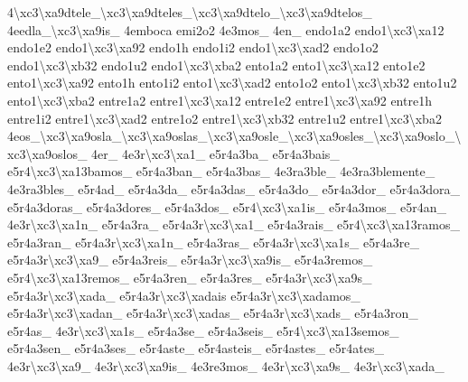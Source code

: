{4\textbackslash{}xc3\textbackslash{}xa9dtele\-\_\textbackslash{}xc3\textbackslash{}xa9dteles\-\_\textbackslash{}xc3\textbackslash{}xa9dtelo\-\_\textbackslash{}xc3\textbackslash{}xa9dtelos\-\_\- 4eedla\-\_\textbackslash{}xc3\textbackslash{}xa9is\-\_\- 4emboca emi2o2 4e3mos\-\_\- 4en\-\_\- endo1a2 endo1\textbackslash{}xc3\textbackslash{}xa12 endo1e2 endo1\textbackslash{}xc3\textbackslash{}xa92 endo1h endo1i2 endo1\textbackslash{}xc3\textbackslash{}xad2 endo1o2 endo1\textbackslash{}xc3\textbackslash{}xb32 endo1u2 endo1\textbackslash{}xc3\textbackslash{}xba2 ento1a2 ento1\textbackslash{}xc3\textbackslash{}xa12 ento1e2 ento1\textbackslash{}xc3\textbackslash{}xa92 ento1h ento1i2 ento1\textbackslash{}xc3\textbackslash{}xad2 ento1o2 ento1\textbackslash{}xc3\textbackslash{}xb32 ento1u2 ento1\textbackslash{}xc3\textbackslash{}xba2 entre1a2 entre1\textbackslash{}xc3\textbackslash{}xa12 entre1e2 entre1\textbackslash{}xc3\textbackslash{}xa92 entre1h entre1i2 entre1\textbackslash{}xc3\textbackslash{}xad2 entre1o2 entre1\textbackslash{}xc3\textbackslash{}xb32 entre1u2 entre1\textbackslash{}xc3\textbackslash{}xba2 4eos\-\_\textbackslash{}xc3\textbackslash{}xa9osla\-\_\textbackslash{}xc3\textbackslash{}xa9oslas\-\_\textbackslash{}xc3\textbackslash{}xa9osle\-\_\textbackslash{}xc3\textbackslash{}xa9osles\-\_\textbackslash{}xc3\textbackslash{}xa9oslo\-\_\textbackslash{}xc3\textbackslash{}xa9oslos\-\_\- 4er\-\_\- 4e3r\textbackslash{}xc3\textbackslash{}xa1\-\_\- e5r4a3ba\-\_\- e5r4a3bais\-\_\- e5r4\textbackslash{}xc3\textbackslash{}xa13bamos\-\_\- e5r4a3ban\-\_\- e5r4a3bas\-\_\- 4e3ra3ble\-\_\- 4e3ra3blemente\-\_\- 4e3ra3bles\-\_\- e5r4ad\-\_\- e5r4a3da\-\_\- e5r4a3das\-\_\- e5r4a3do\-\_\- e5r4a3dor\-\_\- e5r4a3dora\-\_\- e5r4a3doras\-\_\- e5r4a3dores\-\_\- e5r4a3dos\-\_\- e5r4\textbackslash{}xc3\textbackslash{}xa1is\-\_\- e5r4a3mos\-\_\- e5r4an\-\_\- 4e3r\textbackslash{}xc3\textbackslash{}xa1n\-\_\- e5r4a3ra\-\_\- e5r4a3r\textbackslash{}xc3\textbackslash{}xa1\-\_\- e5r4a3rais\-\_\- e5r4\textbackslash{}xc3\textbackslash{}xa13ramos\-\_\- e5r4a3ran\-\_\- e5r4a3r\textbackslash{}xc3\textbackslash{}xa1n\-\_\- e5r4a3ras\-\_\- e5r4a3r\textbackslash{}xc3\textbackslash{}xa1s\-\_\- e5r4a3re\-\_\- e5r4a3r\textbackslash{}xc3\textbackslash{}xa9\-\_\- e5r4a3reis\-\_\- e5r4a3r\textbackslash{}xc3\textbackslash{}xa9is\-\_\- e5r4a3remos\-\_\- e5r4\textbackslash{}xc3\textbackslash{}xa13remos\-\_\- e5r4a3ren\-\_\- e5r4a3res\-\_\- e5r4a3r\textbackslash{}xc3\textbackslash{}xa9s\-\_\- e5r4a3r\textbackslash{}xc3\textbackslash{}xada\-\_\- e5r4a3r\textbackslash{}xc3\textbackslash{}xadais e5r4a3r\textbackslash{}xc3\textbackslash{}xadamos\-\_\- e5r4a3r\textbackslash{}xc3\textbackslash{}xadan\-\_\- e5r4a3r\textbackslash{}xc3\textbackslash{}xadas\-\_\- e5r4a3r\textbackslash{}xc3\textbackslash{}xads\-\_\- e5r4a3ron\-\_\- e5r4as\-\_\- 4e3r\textbackslash{}xc3\textbackslash{}xa1s\-\_\- e5r4a3se\-\_\- e5r4a3seis\-\_\- e5r4\textbackslash{}xc3\textbackslash{}xa13semos\-\_\- e5r4a3sen\-\_\- e5r4a3ses\-\_\- e5r4aste\-\_\- e5r4asteis\-\_\- e5r4astes\-\_\- e5r4ates\-\_\- 4e3r\textbackslash{}xc3\textbackslash{}xa9\-\_\- 4e3r\textbackslash{}xc3\textbackslash{}xa9is\-\_\- 4e3re3mos\-\_\- 4e3r\textbackslash{}xc3\textbackslash{}xa9s\-\_\- 4e3r\textbackslash{}xc3\textbackslash{}xada\-\_\- }
